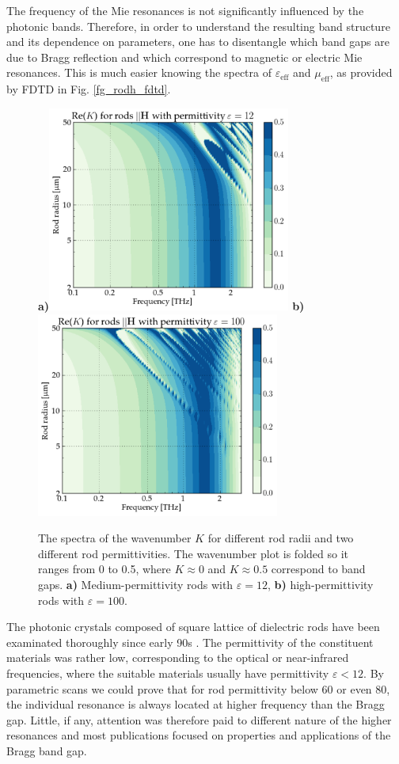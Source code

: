 {The frequency of the Mie resonances is not significantly influenced by the photonic bands. Therefore, in order to understand the resulting band structure and its dependence on parameters, one has to disentangle which band gaps are due to Bragg reflection and which correspond to magnetic or electric Mie resonances. This is much easier knowing the spectra of $\varepsilon_{\text{eff}}$ and $\mu_{\text{eff}}$, as provided by FDTD in Fig. \ref{fg_rodh_fdtd}.
\begin{figure}[ht] \caption{The spectra of the wavenumber $K$ for different rod radii and two different rod permittivities. The wavenumber plot is folded so it ranges from 0 to 0.5, where $K\approx 0$ and $K\approx 0.5$ correspond to band gaps. \textbf{a)} Medium-permittivity rods with $\varepsilon = 12$, \textbf{b)} high-permittivity rods with $\varepsilon = 100$.  } \label{fg_hbar_radiusscan} \centering 
\textbf{a)}\includegraphics[width=8cm]{img/old/HRods_eps012_radiusscan.pdf}
\textbf{b)}\includegraphics[width=8cm]{img/old/HRods_eps100_radiusscan.pdf}
\end{figure}

The photonic crystals composed of square lattice of dielectric rods have been examinated thoroughly since early 90s \cite{plihal1991two, pendry1992_transfer_matrix}. The permittivity of the constituent materials was rather low, corresponding to the optical or near-infrared frequencies, where the suitable materials usually have permittivity $\varepsilon < 12$. By parametric scans we could prove that for rod permittivity below 60 or even 80, the individual resonance is always located at higher frequency than the Bragg gap. Little, if any, attention was therefore paid to different nature of the higher resonances and most publications focused on properties and applications of the Bragg band gap.

}
